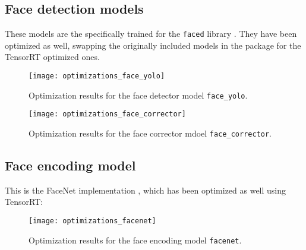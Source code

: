 \subsection{Face detection models}

These models are the specifically trained for the \texttt{faced} library \cite{faced}. They have been optimized as well, swapping the originally included models in the package for the TensorRT optimized ones.

\begin{figure}[h]
	\centering
	\texttt{[image: optimizations\_face\_yolo]}
	\caption{Optimization results for the face detector model \texttt{face\_yolo}.}
\end{figure}

\begin{figure}[h]
	\centering
	\texttt{[image: optimizations\_face\_corrector]}
	\caption{Optimization results for the face corrector mdoel \texttt{face\_corrector}.}
\end{figure}


\subsection{Face encoding model}
This is the FaceNet implementation \cite{facenet}, which has been optimized as well using TensorRT:

\begin{figure}[h]
	\centering
	\texttt{[image: optimizations\_facenet]}
	\caption{Optimization results for the face encoding model \texttt{facenet}.}
\end{figure}